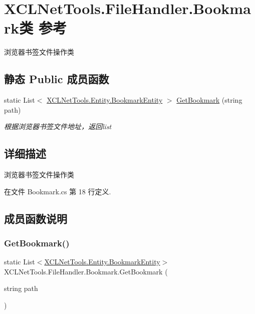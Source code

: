 \hypertarget{class_x_c_l_net_tools_1_1_file_handler_1_1_bookmark}{}\section{X\+C\+L\+Net\+Tools.\+File\+Handler.\+Bookmark类 参考}
\label{class_x_c_l_net_tools_1_1_file_handler_1_1_bookmark}


浏览器书签文件操作类  


\subsection*{静态 Public 成员函数}
\begin{DoxyCompactItemize}
\item 
static List$<$ \hyperlink{class_x_c_l_net_tools_1_1_entity_1_1_bookmark_entity}{X\+C\+L\+Net\+Tools.\+Entity.\+Bookmark\+Entity} $>$ \hyperlink{class_x_c_l_net_tools_1_1_file_handler_1_1_bookmark_ab84885635ae274703936c5c10ae0f67c}{Get\+Bookmark} (string path)
\begin{DoxyCompactList}\small\item\em 根据浏览器书签文件地址，返回list \end{DoxyCompactList}\end{DoxyCompactItemize}


\subsection{详细描述}
浏览器书签文件操作类 



在文件 Bookmark.\+cs 第 18 行定义.



\subsection{成员函数说明}
\mbox{\label{class_x_c_l_net_tools_1_1_file_handler_1_1_bookmark_ab84885635ae274703936c5c10ae0f67c}} 
\subsubsection{\texorpdfstring{Get\+Bookmark()}{GetBookmark()}}
{\footnotesize\ttfamily static List$<$\hyperlink{class_x_c_l_net_tools_1_1_entity_1_1_bookmark_entity}{X\+C\+L\+Net\+Tools.\+Entity.\+Bookmark\+Entity}$>$ X\+C\+L\+Net\+Tools.\+File\+Handler.\+Bookmark.\+Get\+Bookmark (\begin{DoxyParamCaption}\item[{string}]{path }\end{DoxyParamCaption})\hspace{0.3cm}{\ttfamily [static]}}



